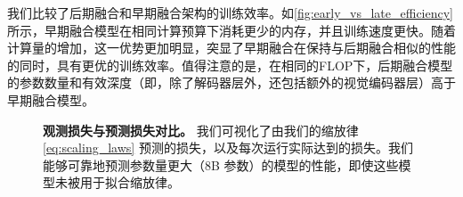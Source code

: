 

我们比较了后期融合和早期融合架构的训练效率。如\cref{fig:early_vs_late_efficiency}所示，早期融合模型在相同计算预算下消耗更少的内存，并且训练速度更快。随着计算量的增加，这一优势更加明显，突显了早期融合在保持与后期融合相似的性能的同时，具有更优的训练效率。值得注意的是，在相同的FLOP下，后期融合模型的参数数量和有效深度（即，除了解码器层外，还包括额外的视觉编码器层）高于早期融合模型。

\begin{figure*}[h!]
    \centering
    \captionsetup{type=figure}

    \begin{minipage}[t]{0.55\linewidth}
        \centering
        
        \caption{\textbf{观测损失与预测损失对比。} 我们可视化了由我们的缩放律 \cref{eq:scaling_laws} 预测的损失，以及每次运行实际达到的损失。我们能够可靠地预测参数量更大（8B 参数）的模型的性能，即使这些模型未被用于拟合缩放律。}
        \label{fig:observed_vs_predicted_loss_extrapolation}
    \end{minipage}
    \hfill
    \begin{minipage}[t]{0.4\linewidth}
        \begin{minipage}[t]{\linewidth}
            \centering
            \vspace{-5.5cm}
            \setlength{\tabcolsep}{8pt}
            \renewcommand{\arraystretch}{1}
            \label{tab:scaling_laws_errors_main}
        \end{minipage}


\end{minipage}
\end{figure*}
